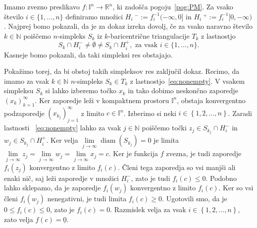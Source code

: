\documentclass[mat1]{fmfdelo}
\newcommand{\R}{\mathbb R}
\newcommand{\N}{\mathbb N}
\DeclareMathOperator{\diam}{diam}
\newcommand{\I}{\mathbb I}
\newcommand{\0}{\underline{0}}
\begin{document}
\begin{dokaz}
Imamo zvezno preslikavo $f : \I^n \to  \R^n$, ki zadošča pogoju~\eqref{pog:PM}. Za vsako število $i \in \{ 1, \dots, n\}$ definiramo množici $H_i\ ^- := f_i^{-1} (-\infty, 0]$ in $H_i\ ^+ := f_i^{-1} [0, -\infty)$. Najprej bomo pokazali, da je za dokaz izreka dovolj, če za vsako naravno število $k \in \N$ poiščemo $n$-simpleks $S_k$ iz $k$-baricentrične triangulacije $T_k$ z lastnostjo 
\begin{equation}\label{eq:nonempty}
S_k \cap H_i^- \neq \emptyset \neq S_k \cap H_i^+, \text{ za vsak } i \in \{ 1, \dots, n \}.
\end{equation}
Kasneje bomo pokazali, da taki simpleksi res obstajajo.

Pokažimo torej, da bi obstoj takih simpleksov res zaključil dokaz. Recimo, da imamo za vsak $k \in \N$ $n$-simpleks $S_k \in T_k$ z lastnostjo~\eqref{eq:nonempty}. V vsakem simpleksu $S_k$ si lahko izberemo točko $x_k$ in tako dobimo neskončno zaporedje $\left ( x_k \right ) _{k = 1}^{\infty}$. Ker zaporedje leži v kompaktnem prostoru $\I^n$, obstaja konvergentno podzaporedje $\left ( x_{k_j} \right ) _{j = 1}^{\infty}$ z limito $c \in \I^n$. Izberimo si neki $i \in \left \{1, 2, \dots, n\right \}$. Zaradi lastnosti ~\eqref{eq:nonempty} lahko za vsak $j \in \N$ poiščemo točki $z_j \in S_{k_j} \cap H_i^-$ in $w_j \in S_{k_j} \cap H_i^+$. Ker velja $\lim\limits_{j \to \infty} \diam(S_{k_j}) = 0$ je limita  $\lim\limits_{j \to \infty} z_j = \lim\limits_{j \to \infty} w_j = \lim\limits_{j \to \infty} x_j = c$. Ker je funkcija $f$ zvezna, je tudi zaporedje $f_i(z_j)$ konvergentno z limito $f_i(c)$. Členi tega zaporedja so vsi manjši ali enaki nič, saj leži zaporedje v množici $H_i^-$, zato je tudi $f_i(c) \leq 0$. Podobno lahko sklepamo, da je zaporedje $f_i(w_j)$ konvergentno z limito $f_i(c)$. Ker so vsi členi $f_i(w_j)$ nenegativni, je tudi limita $f_i(c) \geq 0$. Ugotovili smo, da je $0 \leq f_i(c) \leq 0$, zato je $f_i(c) = 0$. Razmislek velja za vsak $i \in \left \{1, 2, \dots, n\right \}$, zato velja $f(c) = \0$.

\begin{figure}[h!]
	\centering
\end{figure}
\end{dokaz}
\end{document}
